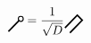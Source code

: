 \documentclass[a4paper,twocolumn,11pt,accepted=2024-02-08]{quantumarticle}
\theoremstyle{break}
\newcommand{\1}{\mathbbm{1}}
\theoremstyle{plain}
\theoremstyle{plain}
\theoremstyle{plain}
\newcommand{\MYcircle}[2]{
\draw[thick, fill=white] (#1,#2) circle (0.1cm); }
\begin{document}
\begin{equation*}
    \begin{tikzpicture}[baseline=(current  bounding  box.center), scale=0.7]
    \MYcircle{0.25}{0.25}
    \draw[very thick] (-0.25,-0.25)--(0.20,0.20);
    \end{tikzpicture}
    =\frac{1}{\sqrt{D}}
    \begin{tikzpicture}[baseline=(current  bounding  box.center), scale=0.7]
    \draw[very thick] (-0.25,-0.25)--(0.25,0.25)--(0.05,0.45)--(-0.45,-0.05);
    \end{tikzpicture}
\end{equation*}
\end{document}
